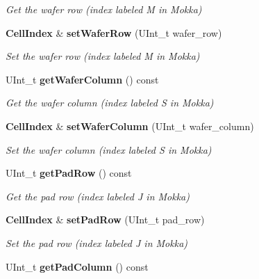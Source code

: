 \begin{DoxyCompactItemize}
\begin{DoxyCompactList}\small\item\em Get the wafer row (index labeled M in Mokka) \end{DoxyCompactList}\item 
{\bf Cell\-Index} \& {\bf set\-Wafer\-Row} (U\-Int\-\_\-t wafer\-\_\-row)\label{classCALICE_1_1CellIndex_a4a3c7537dd7b4077e5463ae08c4c14f0}

\begin{DoxyCompactList}\small\item\em Set the wafer row (index labeled M in Mokka) \end{DoxyCompactList}\item 
U\-Int\-\_\-t {\bf get\-Wafer\-Column} () const \label{classCALICE_1_1CellIndex_a5b0755196e562f4230eb58aa820b5018}

\begin{DoxyCompactList}\small\item\em Get the wafer column (index labeled S in Mokka) \end{DoxyCompactList}\item 
{\bf Cell\-Index} \& {\bf set\-Wafer\-Column} (U\-Int\-\_\-t wafer\-\_\-column)\label{classCALICE_1_1CellIndex_a9680833ddfa0e1137ddc4e4945ecca58}

\begin{DoxyCompactList}\small\item\em Set the wafer column (index labeled S in Mokka) \end{DoxyCompactList}\item 
U\-Int\-\_\-t {\bf get\-Pad\-Row} () const \label{classCALICE_1_1CellIndex_aeecbb345a8d7a8215d020ee2ad5a73c3}

\begin{DoxyCompactList}\small\item\em Get the pad row (index labeled J in Mokka) \end{DoxyCompactList}\item 
{\bf Cell\-Index} \& {\bf set\-Pad\-Row} (U\-Int\-\_\-t pad\-\_\-row)\label{classCALICE_1_1CellIndex_a8e4528b241353e1ae52eb7febecdb371}

\begin{DoxyCompactList}\small\item\em Set the pad row (index labeled J in Mokka) \end{DoxyCompactList}\item 
U\-Int\-\_\-t {\bf get\-Pad\-Column} () const \label{classCALICE_1_1CellIndex_a37471316b7ce32ad1b19f9dc08444193}


\end{DoxyCompactItemize}
